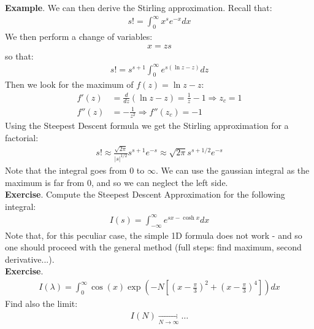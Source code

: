 \documentclass[../template.tex]{subfiles}
\begin{document}
\textbf{Example}. We can then derive the Stirling approximation. Recall that:
\begin{align*}
    s! = \int_0^\infty x^s e^{-x} dx
\end{align*} 
We then perform a change of variables:
\begin{align*}
    x = z s
\end{align*}
so that:
\begin{align*}
    s! = s^{s+1} \int_0^\infty e^{s(\ln z - z)} dz
\end{align*}
Then we look for the maximum of $f(z) = \ln z - z$:
\begin{align*}
    f'(z) &= \frac{d}{dz}(\ln z - z) = \frac{1}{z} - 1 \Rightarrow z_c = 1\\
    f''(z) &= -\frac{1}{z^2} \Rightarrow f''(z_c) = -1 
\end{align*} 
Using the Steepest Descent formula we get the Stirling approximation for a factorial:
\begin{align*}
    s! \approx \frac{\sqrt{2 \pi}}{|s|^{1/2}} s^{s+1} e^{-s} \approx \sqrt{2 \pi} s^{s+1/2} e^{-s}
\end{align*}
Note that the integral goes from $0$ to $\infty$. We can use the gaussian integral as the maximum is far from $0$, and so we can neglect the left side.\\

\textbf{Exercise}. Compute the Steepest Descent Approximation for the following integral:
\begin{align*}
    I(s) = \int_{-\infty}^{\infty} e^{sx - \cosh x} dx
\end{align*} 
Note that, for this peculiar case, the simple 1D formula does not work - and so one should proceed with the general method (full steps: find maximum, second derivative...).\\

\textbf{Exercise}. 
\begin{align*}
    I(\lambda) = \int_{0}^{\infty} \cos(x) \exp \left(-N \left[\left(x-\frac{\pi}{3} \right)^2 + \left(x-\frac{\pi}{3} \right)^4\right]\right)dx
\end{align*} 
Find also the limit:
\begin{align*}
    I(N)  \xrightarrow[N \to \infty]{}  \dots
\end{align*}
\end{document}

